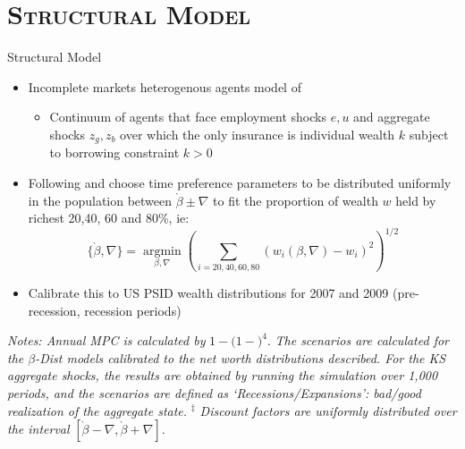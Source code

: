 \documentclass{beamer}
\begin{document}
\section{\scshape Structural Model}
\begin{frame}{Structural Model}
	\begin{itemize}
		\item Incomplete markets heterogenous agents model of \citet{KrusellSmith1999}
		\begin{itemize}
			\item Continuum of agents that face employment shocks ${e,u}$ and aggregate shocks ${z_g, z_b}$ over which the only insurance is individual wealth $k$ subject to borrowing constraint $k>0$
		\end{itemize}
	\item Following \citet{Castaneda2003} and \citet{CSTW2017} choose time preference parameters to be distributed uniformly in the population between $\grave{\beta} \pm \nabla$ to fit the proportion of wealth $w$ held by richest 20,40, 60 and 80\%, ie:
	\begin{equation}
	\{\grave{\beta},\nabla\}  = \underset{\beta,\nabla}{\operatorname{argmin}}  \left(\sum_{i=20,40,60,80}(w_i(\beta,\nabla)-w_i)^2\right)^{1/2}
	\label{eqn:betaMin}
	\end{equation}
	\item Calibrate this to US PSID wealth distributions for 2007 and 2009 (pre-recession, recession periods)
	\end{itemize}
\end{frame}





\begin{frame}{}
	\begin{table}[h!]
	\resizebox{1\textwidth}{!}{
		
	}
	\begin{tablenotes}
	\linespread{1}\tiny
		\item	{ \textit{Notes: Annual MPC is calculated by }$1-(1-$$)^{4}$. \textit{ The scenarios
				are calculated for the $\beta$-Dist models calibrated to the net worth distributions described. For the KS aggregate shocks, the results are obtained by running the simulation over 1,000 periods, and the scenarios are defined as `Recessions/Expansions': bad/good realization of the aggregate state.}
			${}^\ddagger$ \textit{Discount factors are uniformly distributed over the interval} $[\grave{\beta}-\nabla,\grave{\beta}+\nabla]$.}
	\end{tablenotes}
	\label{table:MPCBetaDist}
\end{table}
\end{frame}
\end{document}
